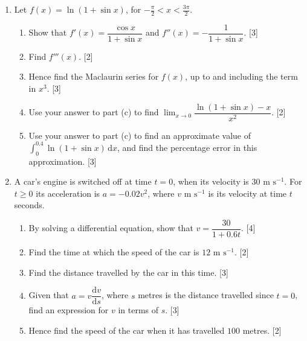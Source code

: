 \documentclass[12pt, twoside]{article}
\begin{document}
\begin{enumerate}[itemsep=0.15cm]

\newpage

\emph{Answer Problems 3--5 on lined paper.}

\item[3.] [Maximum mark: 13]

Let $f(x) = \ln(1 + \sin x)$, for $-\frac{\pi}{2} < x < \frac{3\pi}{2}$.

\begin{enumerate}[itemsep=0.05cm]
  \item Show that $f'(x) = \dfrac{\cos x}{1 + \sin x}$ and
  $f''(x) = -\dfrac{1}{1 + \sin x}$. \hfill [3]
  \item Find $f'''(x)$. \hfill [2]
  \item Hence find the Maclaurin series for $f(x)$, up to and including
  the term in $x^{3}$. \hfill [3]
  \item Use your answer to part (c) to find
  $\lim_{x \to 0} \dfrac{\ln(1 + \sin x) - x}{x^{2}}$. \hfill [2]
  \item Use your answer to part (c) to find an approximate value of
  $\int_{0}^{0.4} \ln(1 + \sin x)\,\mathrm{d}x$, and find the
  percentage error in this approximation. \hfill [3]
\end{enumerate}


\item[4.] [Maximum mark: 14]

A car's engine is switched off at time $t = 0$, when its velocity is
$30 \text{ m s}^{-1}$. For $t \geq 0$ its acceleration is $a = -0.02v^{2}$,
where $v \text{ m s}^{-1}$ is its velocity at time $t$ seconds.

\begin{enumerate}[itemsep=0.05cm]
  \item By solving a differential equation, show that
  $v = \dfrac{30}{1 + 0.6t}$. \hfill [4]
  \item Find the time at which the speed of the car is
  $12 \text{ m s}^{-1}$. \hfill [2]
  \item Find the distance travelled by the car in this time. \hfill [3]
  \item Given that $a = v\dfrac{\mathrm{d}v}{\mathrm{d}s}$, where $s$ metres
  is the distance travelled since $t = 0$, find an expression for $v$ in
  terms of $s$. \hfill [3]
  \item Hence find the speed of the car when it has travelled
  $100$ metres. \hfill [2]
\end{enumerate}



\end{enumerate}
\end{document}

